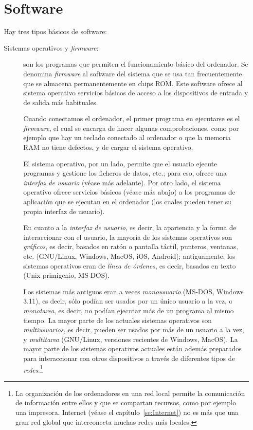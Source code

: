 \section{Software} \label{ss:programari} 

Hay tres tipos básicos de software: 

\begin{description} \item[Sistemas operativos y \emph{firmware}:] son los programas que permiten el funcionamiento básico del ordenador. Se denomina \emph{firmware} al software del sistema que se usa tan frecuentemente que se almacena permanentemente en chips ROM. Este software ofrece al sistema operativo servicios básicos de acceso a los dispositivos de entrada y de salida más habituales. 

Cuando conectamos el ordenador, el primer programa en ejecutarse es el \emph{firmware}, el cual se encarga de hacer algunas comprobaciones, como por ejemplo que hay un teclado conectado al ordenador o que la memoria RAM no tiene defectos, y de cargar el sistema operativo. 

El sistema operativo, por un lado, permite que el usuario ejecute programas y gestione los ficheros de datos, etc.; para eso, ofrece una \emph{interfaz de usuario} (véase más adelante). Por otro lado, el sistema operativo ofrece servicios básicos (véase más abajo) a los programas de aplicación que se ejecutan en el ordenador (los cuales pueden tener su propia interfaz de usuario). 

En cuanto a la \emph{interfaz de usuario}, es decir, la apariencia y la forma de interaccionar con el usuario, la mayoría de los sistemas operativos son \emph{gráficos}, es decir, basados en ratón o pantalla táctil, punteros, ventanas, etc. (GNU/Linux, Windows, MacOS, iOS, Android); antiguamente, los sistemas operativos eran de {\em línea de órdenes}, es decir, basados en texto (Unix primigenio, MS-DOS). 

Los sistemas más antiguos eran a veces \emph{monousuario} (MS-DOS, Windows 3.11), es decir, sólo podían ser usados por un único usuario a la vez, o \emph{monotarea}, es decir, no podían ejecutar más de un programa al mismo tiempo. La mayor parte de los actuales sistemas operativos son \emph{multiusuarios}, es decir, pueden ser usados por más de un usuario a la vez, y \emph{multitarea} (GNU/Linux, versiones recientes de Windows, MacOS). La mayor parte de los sistemas operativos actuales están además preparados para interaccionar con otros dispositivos a través de diferentes tipos de \emph{redes}.\footnote{La organización de los ordenadores en una red local permite la comunicación de información entre ellos y que se compartan recursos, como por ejemplo una impresora. Internet (véase el capítulo~\ref{se:Internet}) no es más que una gran red global que interconecta muchas redes más locales.} 


\end{description}
